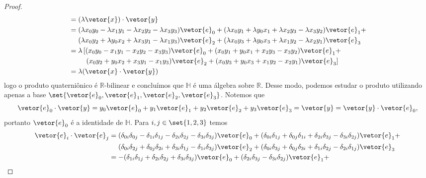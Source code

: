 \begin{proof}
\begin{align*}
                                         &= (\lambda \vetor{x})\cdot\vetor{y}\\
                                         &= (\lambda x_0 y_0 - \lambda x_1 y_1 - \lambda x_2y_2 - \lambda x_3y_3)\vetor{e}_0 + (\lambda x_0y_1 + \lambda y_0 x_1 + \lambda x_2y_3 - \lambda x_3 y_2)\vetor{e}_1 +\\
                                         &\mathrel{\phantom{=}}(\lambda x_0y_2 + \lambda y_0x_2 + \lambda x_3y_1 - \lambda x_1y_3)\vetor{e}_2 + (\lambda x_0y_3 + \lambda y_0x_3 + \lambda x_1y_2 - \lambda x_2y_1)\vetor{e}_3 \\
                                         &= \lambda\left[(x_0 y_0 - x_1 y_1 - x_2y_2 - x_3y_3)\vetor{e}_0 + (x_0y_1 + y_0 x_1 + x_2y_3 - x_3 y_2)\vetor{e}_1 +\right.\\
                                         &\mathrel{\phantom{=}}\phantom{\lambda[}\left.(x_0y_2 + y_0x_2 + x_3y_1 - x_1y_3)\vetor{e}_2 + (x_0y_3 + y_0x_3 + x_1y_2 - x_2y_1)\vetor{e}_3\right]\\
                                         &= \lambda(\vetor{x}\cdot \vetor{y})
    \end{align*}
    logo o produto quaterniônico é \(\mathbb{R}\)-bilinear e concluímos que \(\mathbb{H}\) é uma álgebra sobre \(\mathbb{R}\). Desse modo, podemos estudar o produto utilizando apenas a base \(\set{\vetor{e}_0, \vetor{e}_1, \vetor{e}_2, \vetor{e}_3}\). Notemos que
    \begin{equation*}
        \vetor{e}_0\cdot\vetor{y} = y_0\vetor{e}_0 + y_1\vetor{e}_1 + y_2 \vetor{e}_2 + y_3\vetor{e}_3 = \vetor{y} = \vetor{y}\cdot\vetor{e}_0,
    \end{equation*}
    portanto \(\vetor{e}_0\) é a identidade de \(\mathbb{H}\). Para \(i,j \in \set{1,2,3}\) temos
    \begin{align*}
        \vetor{e}_i\cdot\vetor{e}_j
        &= (\delta_{0 i} \delta_{0 j} - \delta_{1 i} \delta_{1 j} - \delta_{2 i}\delta_{2 j} - \delta_{3 i}\delta_{3 j})\vetor{e}_0 + (\delta_{0 i}\delta_{1 j} + \delta_{0 j}\delta_{1 i} + \delta_{2 i}\delta_{3 j} - \delta_{3 i} \delta_{2 j})\vetor{e}_1 + \\
        &\mathrel{\phantom{=}} (\delta_{0 i}\delta_{2 j} + \delta_{0 j}\delta_{2 i} + \delta_{3 i}\delta_{1 j} - \delta_{1 i}\delta_{3 j})\vetor{e}_2 + (\delta_{0 i}\delta_{3 j} + \delta_{0 j}\delta_{3 i} + \delta_{1 i}\delta_{2 j} - \delta_{2 i}\delta_{1 j})\vetor{e}_3\\
        &= -(\delta_{1 i} \delta_{1 j} + \delta_{2 i}\delta_{2 j} + \delta_{3 i}\delta_{3 j})\vetor{e}_0 + (\delta_{2 i}\delta_{3 j} - \delta_{3 i} \delta_{2 j})\vetor{e}_1 +

\end{align*}
\end{proof}
